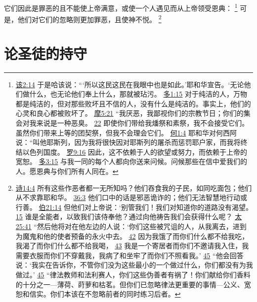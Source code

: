 \documentclass[12pt, a4paper, oneside]{ctexart}
\begin{document}
	它们因此是罪恶的且不能使上帝满意，或使一个人遇见而从上帝领受恩典：
	\footnote {
		\href{https://biblehub.com/haggai/2-14.htm}{该2:14} 于是哈该说：“‘所以这民这民在我眼中也是如此。’耶和华宣告。‘无论他们做什么，也无论他们奉上什么，那就被玷污。
		\href{https://biblehub.com/titus/1-15.htm}{多1:15} 对于纯洁的人，万物都是纯洁的，但对那些败坏且不信的人，没有什么是纯洁的。事实上，他们的心灵和良心都被败坏了。
		\href{https://biblehub.com/amos/5-21.htm}{摩5:21} “我厌恶，我鄙视你们的宗教节日；你们的集会对我来说是一种恶臭。
		\href{https://biblehub.com/amos/5-22.htm}{22} 即使你们带给我燔祭和素祭，我不会接受它们。虽然你们带来上等的团契祭，但我不会理会它们。
		\href{https://biblehub.com/hosea/1-4.htm}{何1:4} 耶和华对何西阿说：“叫他耶斯列，因为我将很快因对耶斯列的屠杀而惩罚耶户家，而我将终结以色列国度。
		\href{https://biblehub.com/romans/9-16.htm}{罗9:16} 因此，这不依赖于人的欲望或努力，而依赖于上帝的宽恕。
		\href{https://biblehub.com/titus/3-15.htm}{多3:15} 与我一同的每个人都向你送来问候。问候那些在信中爱我们的人。愿恩典与你们所有人同在。
	}
	可是，他们对它们的忽略则更加罪恶，且使神不悦。
	\footnote {
		\href{https://biblehub.com/psalms/14-4.htm}{诗14:4} 所有这些作恶者都一无所知吗？他们吞食我的子民，如同吃面包；他们从不求靠耶和华。
		\href{https://biblehub.com/psalms/36-3.htm}{36:3} 他们口中的话是邪恶诡诈的；他们无法智慧地行动或行善。
		\href{https://biblehub.com/job/21-14.htm}{伯21:14} 但他们对上帝说：‘别管我们！我们对知道你的道路没有渴望。
		\href{https://biblehub.com/job/21-15.htm}{15} 谁是全能者，以致我们该侍奉他？通过向他祷告我们会获得什么呢？
		\href{https://biblehub.com/matthew/25-41.htm}{太25:41} “然后他将对在他左边的人说：‘你们这些被咒诅的人，从我离去，进到为魔鬼和他的使者预备的永火中去。
		\href{https://biblehub.com/matthew/25-42.htm}{42} 因为我饿了而你们什么都不给我吃，我渴了而你们什么都不给我喝，
		\href{https://biblehub.com/matthew/25-43.htm}{43} 我是一个寄居者而你们不邀请我入住，我需要衣服而你们不穿戴我，我病了和坐牢了而你们不照看我。’
		\href{https://biblehub.com/matthew/25-45.htm}{45} “他会回答说：‘我实在告诉你，不管你们没为这些最小的一个做过什么，你们都没有为我做过。’
		\href{https://biblehub.com/matthew/23-23.htm}{45} “律法教师和法利赛人，你们这些伪善者有祸了！你们献给你们香料的十分之一---薄荷、莳萝和枯茗。但你们已忽略律法更重要的事情---公义、宽恕和信实。你们本该在不忽略前者的同时练习后者。
	}

\section{论圣徒的持守}
\end{document}
